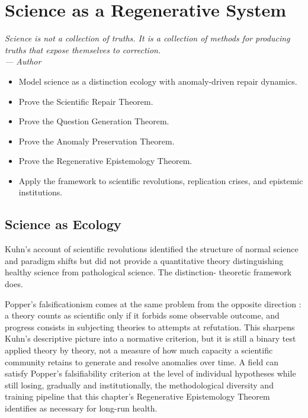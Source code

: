 \documentclass[12pt,twoside,openright]{book}
\newenvironment{epigraph}[2]{%
  \vspace{1em}\begin{flushright}
  \begin{minipage}{0.72\textwidth}
  \itshape\small #1\\[0.4em]
  \upshape\footnotesize\sffamily\color{DistGray}--- #2
  \end{minipage}\end{flushright}\vspace{1.5em}}{}
\newenvironment{objectives}{%
  \begin{tcolorbox}[colback=DistBlue!5,colframe=DistBlue,
    title={\faCheckCircle\enspace Learning Objectives},
    fonttitle=\sffamily\bfseries\color{white},
    attach boxed title to top left={yshift=-2mm,xshift=4mm},
    boxed title style={colback=DistBlue},breakable]
  \begin{itemize}[leftmargin=*,nosep]}{%
  \end{itemize}\end{tcolorbox}\vspace{1em}}
\begin{document}
\chapter{Science as a Regenerative System}
\label{ch:science-regen}

\begin{epigraph}{%
  Science is not a collection of truths.
  It is a collection of methods for producing truths
  that expose themselves to correction.}%
  {Author}
\end{epigraph}

\begin{objectives}
  \item Model science as a distinction ecology with
        anomaly-driven repair dynamics.
  \item Prove the Scientific Repair Theorem.
  \item Prove the Question Generation Theorem.
  \item Prove the Anomaly Preservation Theorem.
  \item Prove the Regenerative Epistemology Theorem.
  \item Apply the framework to scientific revolutions,
        replication crises, and epistemic institutions.
\end{objectives}

\section{Science as Ecology}

Kuhn's account of scientific revolutions
\parencite{kuhn1962structure} identified the structure
of normal science and paradigm shifts but did not
provide a quantitative theory distinguishing healthy
science from pathological science. The distinction-
theoretic framework does.

Popper's falsificationism comes at the same problem from
the opposite direction \parencite{popper1959}: a theory
counts as scientific only if it forbids some observable
outcome, and progress consists in subjecting theories to
attempts at refutation. This sharpens Kuhn's descriptive
picture into a normative criterion, but it is still a
binary test applied theory by theory, not a measure of
how much capacity a scientific community retains to
generate and resolve anomalies over time. A field can
satisfy Popper's falsifiability criterion at the level of
individual hypotheses while still losing, gradually and
institutionally, the methodological diversity and training
pipeline that this chapter's Regenerative Epistemology
Theorem identifies as necessary for long-run health.
\end{document}

